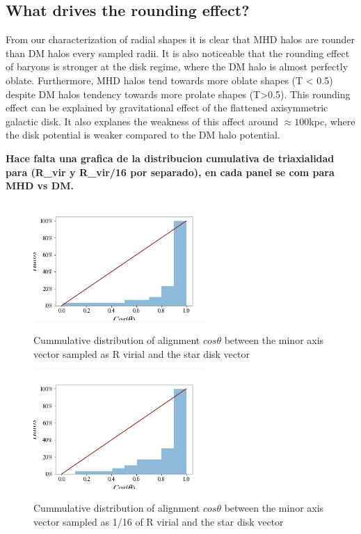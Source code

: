 \documentclass[a4paper,fleqn,usenatbib]{mnras}
\begin{document}
\subsection{What drives the rounding effect?}

From our characterization of radial shapes it is clear that
MHD halos are rounder than DM halos every sampled radii. 
It is also noticeable that the rounding effect of baryons is stronger
at the disk regime, where the DM halo is almost perfectly oblate. 
Furthermore, MHD halos tend towards more oblate shapes (T < 0.5)
despite DM halos tendency towards more prolate shapes (T>0.5). 
This rounding effect can be explained by gravitational effect of the
flattened axisymmetric galactic disk. 
It also explanes the weakness of this affect around $\approx 100$kpc,
where the disk potential is weaker compared to the DM halo potential. 

{\bf Hace falta una grafica de la distribucion cumulativa de
  triaxialidad para (R\_vir y R\_vir/16 por separado), en cada panel se
  com para MHD vs DM.}
  
  \begin{figure}
\centering
{\includegraphics[width=0.6\textwidth]{./pics/Star_Disk_Alignment/Cummulative_Alignment_Histogram_Rvir.png}}
\caption{Cummulative distribution of alignment $cos\theta$ between the minor axis vector sampled as R virial and the star disk vector} \label{fig:alignment_out}
\end{figure} 

  \begin{figure}
\centering
{\includegraphics[width=0.6\textwidth]{./pics/Star_Disk_Alignment/Cummulative_Alignment_Histogram_Rvir_16.png}}
\caption{Cummulative distribution of alignment $cos\theta$ between the minor axis vector sampled as 1/16 of R virial and the star disk vector} \label{fig:alignment_in}
\end{figure} 
\end{document}
